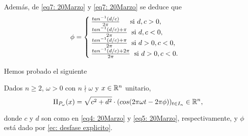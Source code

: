 \noindent
Además, de \eqref{eq7: 20Marzo} y \eqref{eq7: 20Marzo} 
se deduce que
\begin{equation}
\phi =
\begin{cases}
\frac{tan^{-1}(d/c) }{2 \pi}  \hspace{0.4cm}    \text{   si }   d, c > 0,  \\
\frac{tan^{-1}(d/c) + \pi }{2 \pi} \hspace{0.2cm}  \text{si }  d, c < 0,  \\
\frac{tan^{-1}(d/c) + \pi }{2 \pi} \hspace{0.2cm}  \text{si }  d>0,  c < 0,  \\
\frac{tan^{-1}(d/c) + 2\pi }{2 \pi} \hspace{0.2cm}  \text{si }  d>0,  c < 0. 
\end{cases}
\end{equation}

Hemos probado el siguiente
\begin{teo}
Dados $n \geq 2$, $\omega > 0$ con $n \nmid \omega$ y $x \in \mathbb{R}^{n}$
unitario, 
\begin{equation}
\label{ec: desfase explicito}
\Pi_{P_{\omega}} (x) = \sqrt{c^{2}+d^{2}} \cdot (
cos (2 \pi \omega t - 2 \pi \phi)
)_{t \in I_{n}} \in \mathbb{R}^{n},
\end{equation}

\noindent
donde $c$ y $d$ son como en \eqref{eq4: 20Marzo} y 
\eqref{eq5: 20Marzo}, respectivamente, y $\phi$ está 
dado por \eqref{ec: desfase explicito}.
\end{teo}


